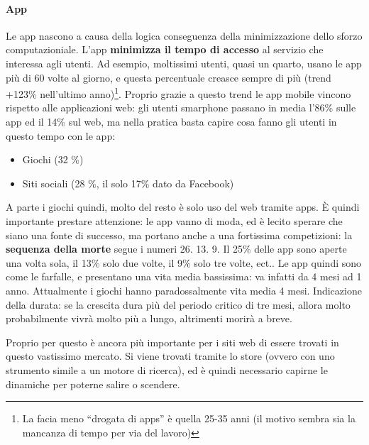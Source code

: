 \paragraph*{App}Le app nascono a causa della logica conseguenza della minimizzazione dello sforzo computazioniale. L'app \textbf{minimizza il tempo di accesso} al servizio che interessa agli utenti. Ad esempio, moltissimi utenti, quasi un quarto, usano le app pi\`u di 60 volte al giorno, e questa percentuale creasce sempre di pi\`u (trend +123\% nell'ultimo anno)\footnote{La facia meno ``drogata di apps'' \`e quella 25-35 anni (il motivo sembra sia la mancanza di tempo per via del lavoro)}. Proprio grazie a questo trend le app mobile vincono rispetto alle applicazioni web: gli utenti smarphone passano in media l'86\% sulle app ed il 14\% sul web, ma nella pratica basta capire cosa fanno gli utenti in questo tempo con le app:
\begin{itemize}

\item Giochi (32 \%)
\item Siti sociali (28 \%, il solo 17\% dato da Facebook)
  
\end{itemize}
A parte i giochi quindi, molto del resto \`e solo uso del web tramite apps. \`E quindi importante prestare attenzione: le app vanno di moda, ed \`e lecito sperare che siano una fonte di successo, ma portano anche a una fortissima competizioni: la \textbf{sequenza della morte} segue i numeri 26. 13. 9. Il 25\% delle app sono aperte una volta sola, il 13\% solo due volte, il 9\% solo tre volte, ect..
Le app quindi sono come le farfalle, e presentano una vita media bassissima: va infatti da 4 mesi ad 1 anno. Attualmente i giochi hanno paradossalmente vita media 4 mesi. Indicazione della durata: se la crescita dura pi\`u del periodo critico di tre mesi, allora molto probabilmente vivr\`a molto pi\`u a lungo, altrimenti morir\`a a breve.

Proprio per questo \`e ancora pi\`u importante per i siti web di essere trovati in questo vastissimo mercato. Si viene trovati tramite lo store (ovvero con uno strumento simile a un motore di ricerca), ed \`e quindi necessario capirne le dinamiche per poterne salire o scendere.

